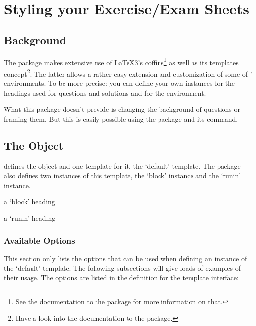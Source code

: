 \documentclass[DIV10,toc=index,toc=bib,numbers=noendperiod]{cnpkgdoc}
\begin{document}
\section{Styling your Exercise/Exam Sheets}\label{part:style}
\subsection{Background}
The \ExSheets package makes extensive use of \LaTeX3's coffins\footnote{See
  the documentation to the  package for more information on
  that.} as well as its templates concept\footnote{Have a look into the
  documentation to the  package.}.  The latter allows a
rather easy extension and customization of some of \ExSheets' environments.
To be more precise: you can define your own instances for the headings used
for questions and solutions and for the  environment.

What this package doesn't provide is changing the background of questions or
framing them.  But this is easily possible using the  package
and its  command.

\subsection{The  Object}\label{sec:exsheets-headings}
\ExSheets defines the object  and one template for it,
the `default' template.  The package also defines two instances of this
template, the `block' instance and the `runin' instance.

\begin{beispiel}
 \begin{question}{1}
  a `block' heading
 \end{question}
 \begin{question}{1}
  a `runin' heading
 \end{question}
\end{beispiel}

\subsubsection{Available Options}
This section only lists the options that can be used when defining an instance
of the `default' template.  The following subsections will give loads of
examples of their usage.  The options are listed in the definition for the
template interface:
\end{document}
